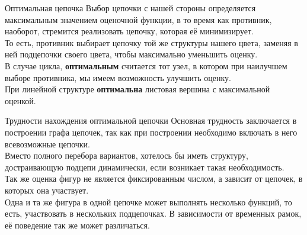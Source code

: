\begin{frame}{Оптимальная цепочка}
Выбор цепочки с нашей стороны определяется максимальным значением оценочной функции, в то время как противник, наоборот, стремится реализовать цепочку, которая её минимизирует. \\
То есть, противник выбирает цепочку той же структуры нашего цвета, заменяя в ней подцепочки своего цвета, чтобы максимально уменьшить оценку. \\
В случае цикла, \textbf{оптимальным} считается тот узел, в котором при наилучшем выборе противника, мы имеем возможность улучшить оценку. \\
При линейной структуре \textbf{оптимальна} листовая вершина с максимальной оценкой.
\end{frame}

\begin{frame}{Трудности нахождения оптимальной цепочки} %
Основная трудность заключается в построении графа цепочек, так как при построении необходимо включать в него всевозможные цепочки. \\
Вместо полного перебора вариантов, хотелось бы иметь структуру, достраивающую подцепи динамически, если возникает такая необходимость.\\
Так же оценка фигур не является фиксированным числом, а зависит от цепочек, в которых она участвует. \\
Одна и та же фигура в одной цепочке может выполнять несколько функций, то есть, участвовать в нескольких подцепочках. В зависимости от временных рамок, её поведение так же может различаться. 
\end{frame}

\endinput
\begin{frame}{Результаты}
{{$$\begin{cases}
\alpha_0 < \alpha_1 \\
\alpha_1 > \alpha_2 \\
\alpha_2 < \alpha_3 \\
\alpha_3 > \alpha_0
\end{cases}
$$}}
На данный момент программная реализация: \\
\begin{itemize}
\item находит пути на пустой доске (подцепи-0); \\
\item маркирует поля траектории по признаку проходимости; \\
\item находит кандидатные подцепи. \\
\end{itemize}
\end{frame}

